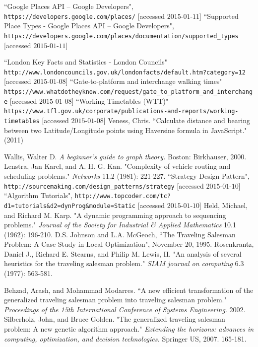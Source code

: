 \documentclass[a4paper, 10pt]{report}
\begin{document}
\begin{appendices}
\begin{thebibliography}{99}
``Google Places API -- Google Developers", \texttt{https://developers.google.com/places/} [accessed $\text{2015-01-11}$]
``Supported Place Types - Google Places API -- Google Developers", \texttt{https://developers.google.com/places/documentation/supported\_types} [accessed $\text{2015-01-11}$]


``London Key Facts and Statistics - London Councils"\\
\texttt{http://www.londoncouncils.gov.uk/londonfacts/default.htm?category=12} [accessed $\text{2015-01-08}$]
``Gate-to-platform and interchange walking times"\\
\texttt{https://www.whatdotheyknow.com/request/gate\_to\_platform\_and\_interchange}
[accessed $\text{2015-01-08}$]
``Working Timetables (WTT)"\\
\texttt{https://www.tfl.gov.uk/corporate/publications-and-reports/working-timetables} [accessed $\text{2015-01-08}$]
Veness, Chris. ``Calculate distance and bearing between two Latitude/Longitude points using Haversine formula in JavaScript." (2011)

Wallis, Walter D. \textit{A beginner's guide to graph theory.} Boston: Birkhauser, 2000.
Lenstra, Jan Karel, and A. H. G. Kan. "Complexity of vehicle routing and scheduling problems." \textit{Networks} 11.2 (1981): 221-227.
``Strategy Design Pattern", \texttt{http://sourcemaking.com/design\_patterns/strategy} [accessed $\text{2015-01-10}$]
``Algorithm Tutorials",
\texttt{http://www.topcoder.com/tc?d1=tutorials\&d2=dynProg\&module=Static}
[accessed $\text{2015-01-10}$]
Held, Michael, and Richard M. Karp. "A dynamic programming approach to sequencing problems." \textit{Journal of the Society for Industrial \& Applied Mathematics} 10.1 (1962): 196-210.
D.S. Johnson and L.A. McGeoch, ``The Traveling
Salesman Problem: A Case Study in Local Optimization",
November 20, 1995.
Rosenkrantz, Daniel J., Richard E. Stearns, and Philip M. Lewis, II. "An analysis of several heuristics for the traveling salesman problem." \textit{SIAM journal on computing} 6.3 (1977): 563-581.

Behzad, Arash, and Mohammad Modarres. ``A new efficient transformation of the generalized traveling salesman problem into traveling salesman problem." \textit{Proceedings of the 15th International Conference of Systems Engineering}. 2002.
Silberholz, John, and Bruce Golden. "The generalized traveling salesman problem: A new genetic algorithm approach." \textit{Extending the horizons: advances in computing, optimization, and decision technologies.} Springer US, 2007. 165-181.


\end{thebibliography}
\end{appendices}
\end{document}
